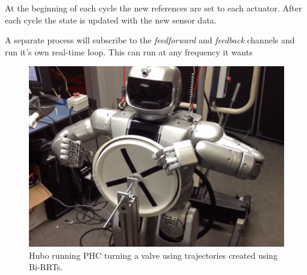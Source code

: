 At the beginning of each cycle the new references are set to each actuator.  
After each cycle the state is updated with the new sensor data.

A separate process will subscribe to the \textit{feedforward} and \textit{feedback} channels and run it's own real-time loop.  
This can run at any frequency it wants

\begin{figure}[thpb]
  \centering
\includegraphics[width=1.0\columnwidth]{./pix/hubo_valve.png}
  \caption{Hubo running PHC turning a valve using trajectories created using Bi-RRTs. }
  \label{fig:valve}
\end{figure}

